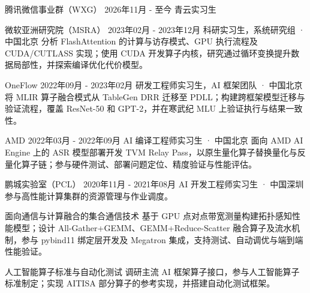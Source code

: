 \documentclass[10pt,a4paper]{article}
\begin{document}


\cventry
  {腾讯微信事业群（WXG）}
  {2026年11月 - 至今}
  {青云实习生}
  {}

\cventry
  {微软亚洲研究院（MSRA）}
  {2023年02月 - 2023年12月}
  {科研实习生，系统研究组 · 中国北京}
  {分析 FlashAttention 的计算与访存模式、GPU 执行流程及 CUDA/CUTLASS 实现；使用 CUDA 开发算子内核，研究通过循环变换提升数据局部性，并探索编译优化代价模型。}

\cventry
  {OneFlow}
  {2022年09月 - 2023年02月}
  {研发工程师实习生，AI 框架团队 · 中国北京}
  {将 MLIR 算子融合模式从 TableGen DRR 迁移至 PDLL；构建跨框架模型迁移与验证流程，覆盖 ResNet-50 和 GPT-2，并在寒武纪 MLU 上验证执行与结果一致性。}

\cventry
  {AMD}
  {2022年03月 - 2022年09月}
  {AI 编译工程师实习生 · 中国北京}
  {面向 AMD AI Engine 上的 ASR 模型部署开发 TVM Relay Pass，以原生量化算子替换量化与反量化算子链；参与硬件测试、部署问题定位、精度验证与性能评估。}

\cventry
  {鹏城实验室（PCL）}
  {2020年11月 - 2021年08月}
  {AI 开发工程师实习生 · 中国深圳}
  {参与高性能计算集群的资源管理与作业调度。}


\cvproject
  {面向通信与计算融合的集合通信技术}
  {基于 GPU 点对点带宽测量构建拓扑感知性能模型；设计 All-Gather+GEMM、GEMM+Reduce-Scatter 融合算子及流水机制，参与 pybind11 绑定层开发及 Megatron 集成，支持测试、自动调优与端到端性能验证。}

\cvproject
  {人工智能算子标准与自动化测试}
  {调研主流 AI 框架算子接口，参与人工智能算子标准制定；实现 AITISA 部分算子的参考实现，并搭建自动化测试框架。}


\end{document}
